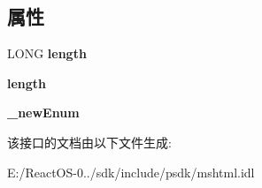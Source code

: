 \subsection*{属性}
\begin{DoxyCompactItemize}
\item 
\mbox{\label{interface_m_s_h_t_m_l_1_1_disp_h_t_m_l_element_collection_a95823edab975b4a4b91d123fdc28b197}} 
L\+O\+NG {\bfseries length}
\item 
\mbox{\label{interface_m_s_h_t_m_l_1_1_disp_h_t_m_l_element_collection_a846451a00cad01d1f4b56ed411f40ee1}} 
{\bfseries length}
\item 
\mbox{\label{interface_m_s_h_t_m_l_1_1_disp_h_t_m_l_element_collection_a1790d706a513079c6f455688f7b99881}} 
{\bfseries \+\_\+new\+Enum}
\end{DoxyCompactItemize}


该接口的文档由以下文件生成\+:\begin{DoxyCompactItemize}
\item 
E\+:/\+React\+O\+S-\/0../sdk/include/psdk/mshtml.\+idl\end{DoxyCompactItemize}
